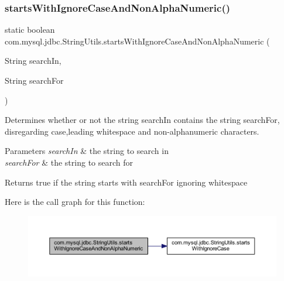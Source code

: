 \subsubsection{\texorpdfstring{starts\+With\+Ignore\+Case\+And\+Non\+Alpha\+Numeric()}{startsWithIgnoreCaseAndNonAlphaNumeric()}}
{\footnotesize\ttfamily static boolean com.\+mysql.\+jdbc.\+String\+Utils.\+starts\+With\+Ignore\+Case\+And\+Non\+Alpha\+Numeric (\begin{DoxyParamCaption}\item[{String}]{search\+In,  }\item[{String}]{search\+For }\end{DoxyParamCaption})\hspace{0.3cm}{\ttfamily [static]}}

Determines whether or not the string \textquotesingle{}search\+In\textquotesingle{} contains the string \textquotesingle{}search\+For\textquotesingle{}, disregarding case,leading whitespace and non-\/alphanumeric characters.


\begin{DoxyParams}{Parameters}
{\em search\+In} & the string to search in \\
\hline
{\em search\+For} & the string to search for\\
\hline
\end{DoxyParams}
\begin{DoxyReturn}{Returns}
true if the string starts with \textquotesingle{}search\+For\textquotesingle{} ignoring whitespace 
\end{DoxyReturn}
Here is the call graph for this function\+:
\nopagebreak
\begin{figure}[H]
\begin{center}
\leavevmode
\includegraphics[width=350pt]{classcom_1_1mysql_1_1jdbc_1_1_string_utils_a9e913ad5a1846fd695d58c3b7b3719de_cgraph}
\end{center}
\end{figure}
\mbox{\label{classcom_1_1mysql_1_1jdbc_1_1_string_utils_a6b08be3e1e6f1b48cd88d94373acd13b}} 
